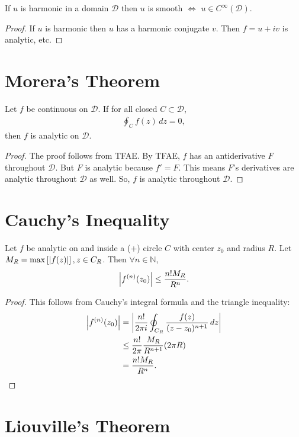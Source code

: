 \documentclass{article}
\theoremstyle{definition}
\newcommand{\f}[2]{\frac{#1}{#2}}
\newcommand{\lb}{\left[}
\newcommand{\rb}{\right]}
\newcommand{\nn}{\nonumber}
\begin{document}
If $u$ is harmonic in a domain $\mathcal{D}$ then $u$ is smooth $\iff$ $u \in C^\infty (\mathcal{D})$.

\begin{proof}
	If $u$ is harmonic then $u$ has a harmonic conjugate $v$. Then $f = u + iv$ is analytic, etc. 
\end{proof}

\section{Morera's Theorem}

Let $f$ be continuous on $\mathcal{D}$. If for all closed $C \subset \mathcal{D}$, 
\begin{align}
\oint_C f(z)\,dz = 0,
\end{align}
then $f$ is analytic on $\mathcal{D}$. 

\begin{proof}
	The proof follows from TFAE. By TFAE, $f$ has an antiderivative $F$ throughout $\mathcal{D}$. But $F$ is analytic because $f' = F$. This means $F$'s derivatives are analytic throughout $\mathcal{D}$ as well. So, $f$ is analytic throughout $\mathcal{D}$. 
\end{proof}



\section{Cauchy's Inequality}

Let $f$ be analytic on and inside a (+) circle $C$ with center $z_0$ and radius $R$. Let $M_R = \max\lb \abs{f(z)} \rb, z\in C_R$. Then $\forall n \in \mathbb{N}$, 
\begin{align}
\abs{f^{(n)}(z_0)} \leq \f{n!M_R}{R^n}.
\end{align}


\begin{proof}
	This follows from Cauchy's integral formula and the triangle inequality:
	\begin{align}
	\abs{f^{(n)}(z_0)} &= \abs{\f{n!}{2\pi i}\oint_{C_R}  \f{f(z)}{(z - z_0)^{n+1}} \,dz}\nn\\
	&\leq \f{n!}{2\pi} \f{M_R}{R^{n+1}} (2\pi R)\nn\\
	&= \f{n! M_R}{R^n}.
	\end{align}
\end{proof}


\section{Liouville's Theorem}
\end{document}
